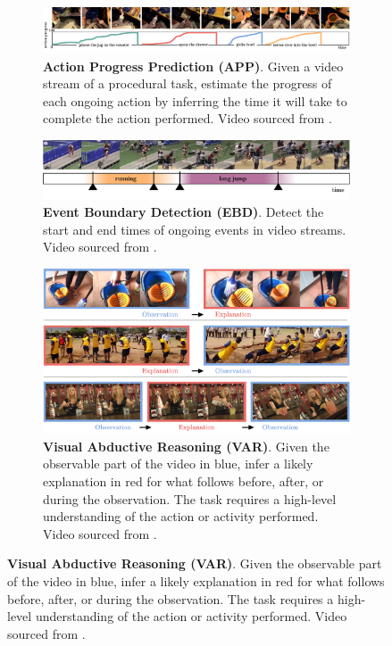 \begin{figure}[t]
\centering
\begin{subfigure}[b]{\textwidth}
\centering
\includegraphics[width=\textwidth]{figs/states/states-action_progress.pdf}
\caption{\textbf{Action Progress Prediction (APP)}. Given a video stream of a procedural task, estimate the progress of each ongoing action by inferring the time it will take to complete the action performed. Video sourced from . \vspace{1em}}
\label{fig:states::progress}
\end{subfigure}
\begin{minipage}{0.49\textwidth}
\begin{subfigure}{\linewidth}
\includegraphics[width=\linewidth]{figs/states/states-event_boundary.pdf}
\caption{\textbf{Event Boundary Detection (EBD)}. Detect the start and end times of ongoing events in video streams. Video sourced from . \vspace{1em}}
\label{fig:states::boundary}
\end{subfigure}
\hfill
\addtocounter{subfigure}{1}
\begin{subfigure}{\linewidth}
\includegraphics[width=\linewidth]{figs/states/states-abductive reasoning.pdf}
\caption{\textbf{Visual Abductive Reasoning (VAR)}. Given the observable part of the video in \textcolor{babyblue}{blue}, infer a likely explanation in \textcolor{fadedred}{red} for what follows before, after, or during the observation. The task requires a high-level understanding of the action or activity performed. Video sourced from . \vspace{1em}}

\end{subfigure}
\end{minipage}
\end{figure}
